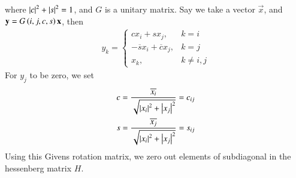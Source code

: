 \documentclass[journal]{IEEEtran}
\begin{document}
where $\left\vert c\right\vert^2 + \left\vert s\right\vert^2 = 1$, and $G$ is a unitary matrix.
\newline
Say we take a vector $\vec{x}$, and $\mathbf{y} = G\left(i, j, c, s\right)\mathbf{x}$, then
\begin{align}
    y_k = \begin{cases}
        c x_i + s x_j, & k = i \\
        -\overline{s} x_i + \overline{c} x_j, & k = j \\
        x_k, & k \neq i, j
    \end{cases}
\end{align}
For $y_j$ to be zero, we set
\begin{align}
    c = \frac{\overline{x_i}}{\sqrt{\left\vert x_i\right\vert^2 + \left\vert x_j\right\vert^2}} = c_{ij}\\
    s = \frac{\overline{x_j}}{\sqrt{\left\vert x_i\right\vert^2 + \left\vert x_j\right\vert^2}} = s_{ij}
\end{align}
Using this Givens rotation matrix, we zero out elements of subdiagonal in the hessenberg matrix $H$.
\end{document}
